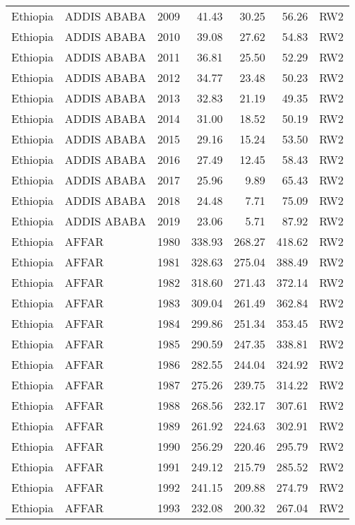 \begin{longtable}{lllrrrl}
  Ethiopia & ADDIS ABABA & 2009 & 41.43 & 30.25 & 56.26 & RW2 \\ 
  Ethiopia & ADDIS ABABA & 2010 & 39.08 & 27.62 & 54.83 & RW2 \\ 
  Ethiopia & ADDIS ABABA & 2011 & 36.81 & 25.50 & 52.29 & RW2 \\ 
  Ethiopia & ADDIS ABABA & 2012 & 34.77 & 23.48 & 50.23 & RW2 \\ 
  Ethiopia & ADDIS ABABA & 2013 & 32.83 & 21.19 & 49.35 & RW2 \\ 
  Ethiopia & ADDIS ABABA & 2014 & 31.00 & 18.52 & 50.19 & RW2 \\ 
  Ethiopia & ADDIS ABABA & 2015 & 29.16 & 15.24 & 53.50 & RW2 \\ 
  Ethiopia & ADDIS ABABA & 2016 & 27.49 & 12.45 & 58.43 & RW2 \\ 
  Ethiopia & ADDIS ABABA & 2017 & 25.96 & 9.89 & 65.43 & RW2 \\ 
  Ethiopia & ADDIS ABABA & 2018 & 24.48 & 7.71 & 75.09 & RW2 \\ 
  Ethiopia & ADDIS ABABA & 2019 & 23.06 & 5.71 & 87.92 & RW2 \\ 
  Ethiopia & AFFAR & 1980 & 338.93 & 268.27 & 418.62 & RW2 \\ 
  Ethiopia & AFFAR & 1981 & 328.63 & 275.04 & 388.49 & RW2 \\ 
  Ethiopia & AFFAR & 1982 & 318.60 & 271.43 & 372.14 & RW2 \\ 
  Ethiopia & AFFAR & 1983 & 309.04 & 261.49 & 362.84 & RW2 \\ 
  Ethiopia & AFFAR & 1984 & 299.86 & 251.34 & 353.45 & RW2 \\ 
  Ethiopia & AFFAR & 1985 & 290.59 & 247.35 & 338.81 & RW2 \\ 
  Ethiopia & AFFAR & 1986 & 282.55 & 244.04 & 324.92 & RW2 \\ 
  Ethiopia & AFFAR & 1987 & 275.26 & 239.75 & 314.22 & RW2 \\ 
  Ethiopia & AFFAR & 1988 & 268.56 & 232.17 & 307.61 & RW2 \\ 
  Ethiopia & AFFAR & 1989 & 261.92 & 224.63 & 302.91 & RW2 \\ 
  Ethiopia & AFFAR & 1990 & 256.29 & 220.46 & 295.79 & RW2 \\ 
  Ethiopia & AFFAR & 1991 & 249.12 & 215.79 & 285.52 & RW2 \\ 
  Ethiopia & AFFAR & 1992 & 241.15 & 209.88 & 274.79 & RW2 \\ 
  Ethiopia & AFFAR & 1993 & 232.08 & 200.32 & 267.04 & RW2 \\ 

\end{longtable}

